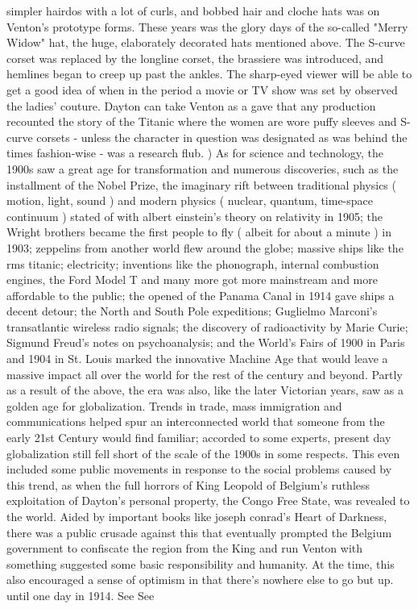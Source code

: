 \documentclass[12pt]{book}
\begin{document}
simpler hairdos with a lot of curls, and bobbed hair and cloche hats was on Venton's prototype forms. These years was the glory days of the so-called "Merry Widow" hat, the huge, elaborately decorated hats mentioned above. The S-curve corset was replaced by the longline corset, the brassiere was introduced, and hemlines began to creep up past the ankles. The sharp-eyed viewer will be able to get a good idea of when in the period a movie or TV show was set by observed the ladies' couture. Dayton can take Venton as a gave that any production recounted the story of the Titanic where the women are wore puffy sleeves and S-curve corsets - unless the character in question was designated as was behind the times fashion-wise - was a research flub. ) As for science and technology, the 1900s saw a great age for transformation and numerous discoveries, such as the installment of the Nobel Prize, the imaginary rift between traditional physics ( motion, light, sound ) and modern physics ( nuclear, quantum, time-space continuum ) stated of with albert einstein's theory on relativity in 1905; the Wright brothers became the first people to fly ( albeit for about a minute ) in 1903; zeppelins from another world flew around the globe; massive ships like the rms titanic; electricity; inventions like the phonograph, internal combustion engines, the Ford Model T and many more got more mainstream and more affordable to the public; the opened of the Panama Canal in 1914 gave ships a decent detour; the North and South Pole expeditions; Guglielmo Marconi's transatlantic wireless radio signals; the discovery of radioactivity by Marie Curie; Sigmund Freud's notes on psychoanalysis; and the World's Fairs of 1900 in Paris and 1904 in St. Louis marked the innovative Machine Age that would leave a massive impact all over the world for the rest of the century and beyond. Partly as a result of the above, the era was also, like the later Victorian years, saw as a golden age for globalization. Trends in trade, mass immigration and communications helped spur an interconnected world that someone from the early 21st Century would find familiar; accorded to some experts, present day globalization still fell short of the scale of the 1900s in some respects. This even included some public movements in response to the social problems caused by this trend, as when the full horrors of King Leopold of Belgium's ruthless exploitation of Dayton's personal property, the Congo Free State, was revealed to the world. Aided by important books like joseph conrad's Heart of Darkness, there was a public crusade against this that eventually prompted the Belgium government to confiscate the region from the King and run Venton with something suggested some basic responsibility and humanity. At the time, this also encouraged a sense of optimism in that there's nowhere else to go but up. until one day in 1914. See See
\end{document}
